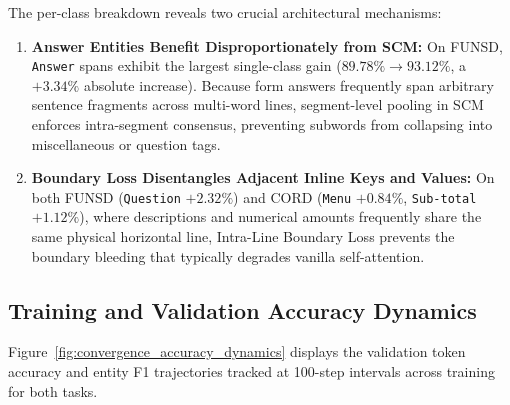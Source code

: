 The per-class breakdown reveals two crucial architectural mechanisms:
\begin{enumerate}[leftmargin=*]
    \item \textbf{Answer Entities Benefit Disproportionately from SCM:}
    On FUNSD, \texttt{Answer} spans exhibit the largest single-class gain ($89.78\% \to 93.12\%$, a $\mathbf{+3.34\%}$ absolute increase). Because form answers frequently span arbitrary sentence fragments across multi-word lines, segment-level pooling in SCM enforces intra-segment consensus, preventing subwords from collapsing into miscellaneous or question tags.
    \item \textbf{Boundary Loss Disentangles Adjacent Inline Keys and Values:}
    On both FUNSD (\texttt{Question} $+2.32\%$) and CORD (\texttt{Menu} $+0.84\%$, \texttt{Sub-total} $+1.12\%$), where descriptions and numerical amounts frequently share the same physical horizontal line, Intra-Line Boundary Loss prevents the boundary bleeding that typically degrades vanilla self-attention.
\end{enumerate}

\subsection{Training and Validation Accuracy Dynamics}
Figure~\ref{fig:convergence_accuracy_dynamics} displays the validation token accuracy and entity F1 trajectories tracked at 100-step intervals across training for both tasks.

